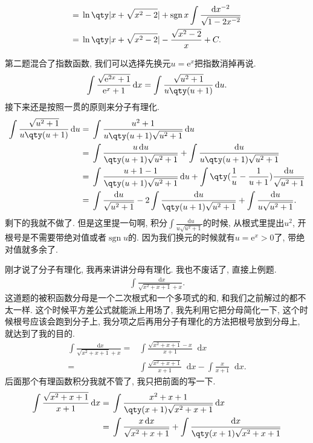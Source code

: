 \documentclass{ctexbook}
\DeclareMathOperator{\sgn}{sgn}
\newcommand{\e}{\mathrm{e}}
\newcommand*{\dif}{\mathop{}\!\mathrm{d}}
\begin{document}
{\begin{align*}
={}&\ln\qty|x+\sqrt{x^{2}-2}|+\sgn{x}\int\frac{\dif{x^{-2}}}{\sqrt{1-2x^{-2}}}\\
={}&\ln\qty|x+\sqrt{x^{2}-2}|-\frac{\sqrt{x^{2}-2}}{x}+C
.\end{align*}\par
第二题混合了指数函数, 我们可以选择先换元$u=\e^{x}$把指数消掉再说. 
\begin{align*}
\int\frac{\sqrt{\e^{2x}+1}}{\e^{x}+1}\dif{x}=\int\frac{\sqrt{u^{2}+1}}{u\qty(u+1)}\dif{u}
.\end{align*}
接下来还是按照一贯的原则来分子有理化. 
\begin{align*}
\int\frac{\sqrt{u^{2}+1}}{u\qty(u+1)}\dif{u}={}&\int\frac{u^{2}+1}{u\qty(u+1)\sqrt{u^{2}+1}}\dif{u}\\
={}&\int\frac{u\dif{u}}{\qty(u+1)\sqrt{u^{2}+1}}+\int\frac{\dif{u}}{u\qty(u+1)\sqrt{u^{2}+1}}\\
={}&\int\frac{u+1-1}{\qty(u+1)\sqrt{u^{2}+1}}\dif{u}+\int\qty(\frac{1}{u}-\frac{1}{u+1})\frac{\dif{u}}{\sqrt{u^{2}+1}}\\
={}&\int\frac{\dif{u}}{\sqrt{u^{2}+1}}-2\int\frac{\dif{u}}{\qty(u+1)\sqrt{u^{2}+1}}+\int\frac{\dif{u}}{u\sqrt{u^{2}+1}}
.\end{align*}
剩下的我就不做了. 但是这里提一句啊, 积分$\int\frac{\dif{u}}{u\sqrt{u^{2}+1}}$的时候, 从根式里提出$u^{2}$, 开根号是不需要带绝对值或者$\sgn{u}$的. 因为我们换元的时候就有$u=\e^{x}>0$了, 带绝对值就多余了. \par
刚才说了分子有理化, 我再来讲讲分母有理化. 我也不废话了, 直接上例题. 
\begin{align*}
\int\frac{\dif{x}}{\sqrt{x^{2}+x+1}+x}
.\end{align*}
这道题的被积函数分母是一个二次根式和一个多项式的和, 和我们之前解过的都不太一样. 这个时候平方差公式就能派上用场了, 我先利用它把分母简化一下, 这个时候根号应该会跑到分子上, 我分项之后再用分子有理化的方法把根号放到分母上, 就达到了我的目的. 
\begin{align*}
\int\frac{\dif{x}}{\sqrt{x^{2}+x+1}+x}={}&\int\frac{\sqrt{x^{2}+x+1}-x}{x+1}\dif{x}\\
={}&\int\frac{\sqrt{x^{2}+x+1}}{x+1}\dif{x}-\int\frac{x}{x+1}\dif{x}
.\end{align*}
后面那个有理函数积分我就不管了, 我只把前面的写一下. 
\begin{align*}
\int\frac{\sqrt{x^{2}+x+1}}{x+1}\dif{x}={}&\int\frac{x^{2}+x+1}{\qty(x+1)\sqrt{x^{2}+x+1}}\dif{x}\\
={}&\int\frac{x\dif{x}}{\sqrt{x^{2}+x+1}}+\int\frac{\dif{x}}{\qty(x+1)\sqrt{x^{2}+x+1}}\\

\end{align*}}
\end{document}
